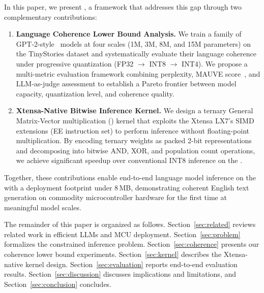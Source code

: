 In this paper, we present \tinybit{}, a framework that addresses this gap
through two complementary contributions:

\begin{enumerate}[leftmargin=*,topsep=2pt,itemsep=1pt]
  \item \textbf{Language Coherence Lower Bound Analysis.} We train a family of
        GPT-2-style~\cite{radford2019language} models at four scales
        (1M, 3M, 8M, and 15M parameters) on the TinyStories dataset and
        systematically evaluate their language coherence under progressive
        quantization (FP32 $\rightarrow$ INT8 $\rightarrow$ INT4). We propose
        a multi-metric evaluation framework combining perplexity, MAUVE
        score~\cite{pillutla2021mauve}, and LLM-as-judge assessment to
        establish a Pareto frontier between model capacity, quantization level,
        and coherence quality.

  \item \textbf{Xtensa-Native Bitwise Inference Kernel.} We design a ternary
        General Matrix-Vector multiplication (\gemv{}) kernel that exploits the
        Xtensa LX7's SIMD extensions (EE instruction set) to perform
        inference without floating-point multiplication. By encoding ternary
        weights as packed 2-bit representations and decomposing \gemv{} into
        bitwise AND, XOR, and population count operations, we achieve
        significant speedup over conventional INT8 inference on the \espss{}.
\end{enumerate}

Together, these contributions enable end-to-end language model inference on the
\espss{} with a deployment footprint under 8\,MB, demonstrating coherent
English text generation on commodity microcontroller hardware for the first
time at meaningful model scales.

The remainder of this paper is organized as follows. Section~\ref{sec:related}
reviews related work in efficient LLMs and MCU deployment. Section~\ref{sec:problem}
formalizes the constrained inference problem. Section~\ref{sec:coherence}
presents our coherence lower bound experiments. Section~\ref{sec:kernel}
describes the Xtensa-native kernel design. Section~\ref{sec:evaluation}
reports end-to-end evaluation results. Section~\ref{sec:discussion} discusses
implications and limitations, and Section~\ref{sec:conclusion} concludes.
